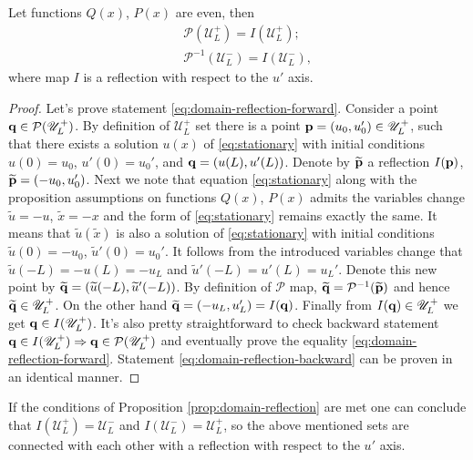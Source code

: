 \begin{proposition}
	Let functions $Q(x)$, $P(x)$ are even, then 
	\begin{eqnarray}
		&& \mathcal{P}(\mathscr{U}_L^+) = I (\mathscr{U}_L^+); \label{eq:domain-reflection-forward} \\
		&& \mathcal{P}^{-1}(\mathscr{U}_L^-) = I (\mathscr{U}_L^-), 	\label{eq:domain-reflection-backward}
	\end{eqnarray}
	where map $I$ is a reflection with respect to the $u'$ axis.
\label{prop:domain-reflection}
\end{proposition}
\begin{proof}
	Let's prove statement \eqref{eq:domain-reflection-forward}.
	Consider a point $\vb{q} \in \mathcal{P}(\mathscr{U}_L^+)$.
	By definition of $\mathscr{U}_L^+$ set there is a point $\vb{p} = (u_0, u_0') \in \mathscr{U}_L^+$, such that there exists a solution $u(x)$ of \eqref{eq:stationary} with initial conditions $u(0) = u_0$, $u'(0) = u_0'$, and $\vb{q} = (u(L), u'(L))$.
	Denote by $\widetilde{\vb{p}}$ a reflection $I(\vb{p})$, $\widetilde{\vb{p}} = (-u_0, u_0')$.
	Next we note that equation \eqref{eq:stationary} along with the proposition assumptions on functions $Q(x)$, $P(x)$ admits the variables change $\widetilde{u} = -u$, $\widetilde{x} = -x$ and the form of \eqref{eq:stationary} remains exactly the same.
	It means that $\widetilde{u}(\widetilde{x})$ is also a solution of \eqref{eq:stationary} with initial conditions $\widetilde{u}(0) = -u_0$, $\widetilde{u}'(0) = u_0'$.
	It follows from the introduced variables change that $\widetilde{u}(-L) = -u(L) = -u_L$ and $\widetilde{u}'(-L) = u'(L) = u_L'$.
	Denote this new point by $\widetilde{\vb{q}} = (\widetilde{u}(-L), \widetilde{u}'(-L))$.
	By definition of $\mathcal{P}$ map, $\widetilde{\vb{q}} = \mathcal{P}^{-1}(\widetilde{\vb{p}})$ and hence $\widetilde{\vb{q}} \in \mathscr{U}_L^+$.
	On the other hand $\widetilde{\vb{q}} = (-u_L, u_L') = I(\vb{q})$.
	Finally from $I(\vb{q)} \in \mathscr{U}_L^+$ we get $\vb{q} \in I(\mathscr{U}_L^+)$.
	It's also pretty straightforward to check backward statement $\vb{q} \in I(\mathscr{U}_L^+) \Rightarrow \vb{q} \in \mathcal{P}(\mathscr{U}_L^+)$ and eventually prove the equality \eqref{eq:domain-reflection-forward}.
	Statement \eqref{eq:domain-reflection-backward} can be proven in an identical manner.
\end{proof}

If the conditions of Proposition \ref{prop:domain-reflection} are met one can conclude that $I (\mathscr{U}_L^+) = \mathscr{U}_L^-$ and $I (\mathscr{U}_L^-) = \mathscr{U}_L^+$, so the above mentioned sets are connected with each other with a reflection with respect to the $u'$ axis.

